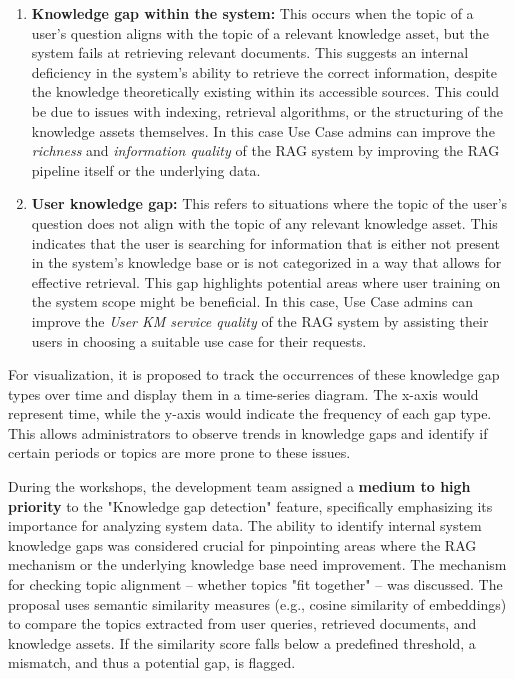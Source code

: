 \documentclass[
	english,
	ruledheaders=section,%
	class=report,%
	thesis={type=bachelor},%
	accentcolor=1b,%
	custommargins=true,%
	marginpar=false,%
	parskip=half-,%
	fontsize=11pt,%
	DIV=14,
]{tudapub}
\begin{document}
\begin{enumerate}
    \item \textbf{Knowledge gap within the system:} This occurs when the topic of a user's question aligns with the topic of a relevant knowledge asset, but the system fails at retrieving relevant documents. This suggests an internal deficiency in the system's ability to retrieve the correct information, despite the knowledge theoretically existing within its accessible sources. This could be due to issues with indexing, retrieval algorithms, or the structuring of the knowledge assets themselves. In this case Use Case admins can improve the \textit{richness} and \textit{information quality} of the RAG system by improving the RAG pipeline itself or the underlying data.
    \item \textbf{User knowledge gap:} This refers to situations where the topic of the user's question does not align with the topic of any relevant knowledge asset. This indicates that the user is searching for information that is either not present in the system's knowledge base or is not categorized in a way that allows for effective retrieval. This gap highlights potential areas where user training on the system scope might be beneficial. In this case, Use Case admins can improve the \textit{User KM service quality} of the RAG system by assisting their users in choosing a suitable use case for their requests.
\end{enumerate}

For visualization, it is proposed to track the occurrences of these knowledge gap types over time and display them in a time-series diagram. The x-axis would represent time, while the y-axis would indicate the frequency of each gap type. This allows administrators to observe trends in knowledge gaps and identify if certain periods or topics are more prone to these issues.

During the workshops, the development team assigned a \textbf{medium to high priority} to the "Knowledge gap detection" feature, specifically emphasizing its importance for analyzing system data. The ability to identify internal system knowledge gaps was considered crucial for pinpointing areas where the RAG mechanism or the underlying knowledge base need improvement. The mechanism for checking topic alignment -- whether topics "fit together" -- was discussed. The proposal uses semantic similarity measures (e.g., cosine similarity of embeddings) to compare the topics extracted from user queries, retrieved documents, and knowledge assets. If the similarity score falls below a predefined threshold, a mismatch, and thus a potential gap, is flagged.
\end{document}
